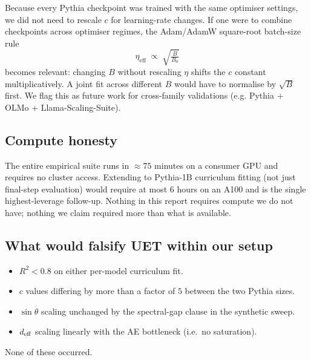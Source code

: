 Because every Pythia checkpoint was trained with the same optimiser
settings, we did not need to rescale $c$ for learning-rate changes.
If one were to combine checkpoints across optimiser regimes, the
Adam/AdamW square-root batch-size rule
\citep{loshchilov2019adamw}
\[
\eta_{\text{eff}} \;\propto\; \sqrt{\tfrac{B}{B_0}}
\]
becomes relevant: changing $B$ without rescaling $\eta$ shifts the
$c$ constant multiplicatively. A joint fit across different $B$ would
have to normalise by $\sqrt{B}$ first. We flag this as future work for
cross-family validations (e.g. Pythia + OLMo + Llama-Scaling-Suite).

\subsection{Compute honesty}

The entire empirical suite runs in $\approx 75$ minutes on a consumer
GPU and requires no cluster access. Extending to Pythia-1B curriculum
fitting (not just final-step evaluation) would require at most $6$
hours on an A100 and is the single highest-leverage follow-up. Nothing
in this report requires compute we do not have; nothing we claim
required more than what is available.

\subsection{What would falsify UET within our setup}

\begin{itemize}[leftmargin=1.5em,itemsep=2pt]
\item $R^2 < 0.8$ on either per-model curriculum fit.
\item $c$ values differing by more than a factor of $5$ between the
      two Pythia sizes.
\item $\sin\theta$ scaling unchanged by the spectral-gap clause in
      the synthetic sweep.
\item $d_{\mathrm{eff}}$ scaling linearly with the AE bottleneck (i.e.~no
      saturation).
\end{itemize}
None of these occurred.
